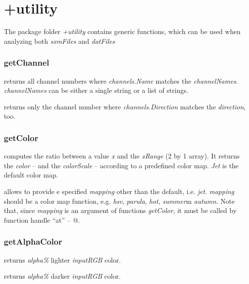 \section{+utility}

The package folder \emph{+utility} contains generic functions, which can be used when analyzing both \emph{sxmFiles} and \emph{datFiles}
\subsubsection{getChannel}
\bdf
{} returns all channel numbers where \emph{channels.Name} matches the \emph{channelNames}. \emph{channelNames} can be either a single string or a list of strings.

 returns only the channel number where \emph{channels.Direction} matches the \emph{direction}, too.
\edf
\subsubsection{getColor}
\bdf
{} computes the ratio between a value \emph{x} and the \emph{xRange} (2 by 1 array). It returns the \emph{color} --  and the \emph{colorScale}  -- according to a predefined color map. \emph{Jet} is the default color map. 

 allows to provide e specified \emph{mapping} other than the default, i.e. \emph{jet}. \emph{mapping} should be a color map function, e.g. \emph{hsv}, \emph{parula}, \emph{hot}, \emph{summer}m \emph{autumn}. Note that, since \emph{mapping} is an argument of functions \emph{getColor}, it must be called by function handle ``at'' -- @.
\edf
\subsubsection{getAlphaColor}
\bdf
{} returns \emph{alpha\%} lighter \emph{inputRGB} color.

 returns \emph{alpha\%} darker \emph{inputRGB} color.
\edf